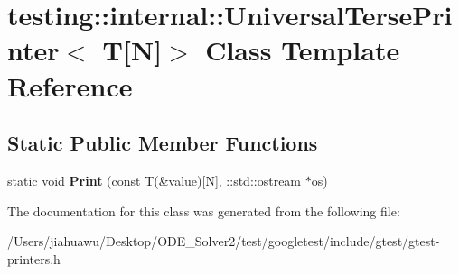 \hypertarget{classtesting_1_1internal_1_1_universal_terse_printer_3_01_t[_n]_4}{}\section{testing\+:\+:internal\+:\+:Universal\+Terse\+Printer$<$ T\mbox{[}N\mbox{]}$>$ Class Template Reference}
\label{classtesting_1_1internal_1_1_universal_terse_printer_3_01_t[_n]_4}
\subsection*{Static Public Member Functions}
\begin{DoxyCompactItemize}
\item 
\mbox{\label{classtesting_1_1internal_1_1_universal_terse_printer_3_01_t[_n]_4_a9e0ceb62fda7dc46ebcf5f911e459a49}} 
static void {\bfseries Print} (const T(\&value)\mbox{[}N\mbox{]}, \+::std\+::ostream $\ast$os)
\end{DoxyCompactItemize}


The documentation for this class was generated from the following file\+:\begin{DoxyCompactItemize}
\item 
/\+Users/jiahuawu/\+Desktop/\+O\+D\+E\+\_\+\+Solver2/test/googletest/include/gtest/gtest-\/printers.\+h\end{DoxyCompactItemize}
